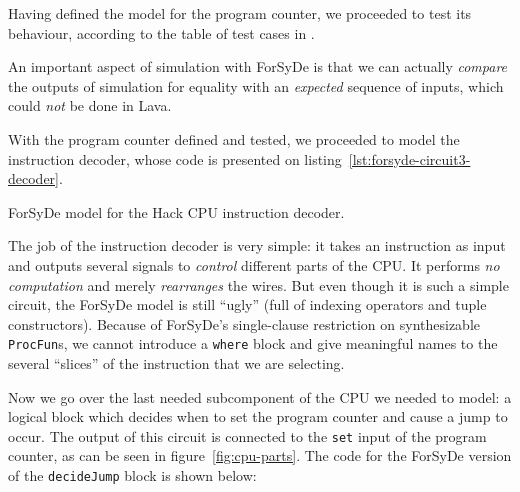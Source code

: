             Having defined the model for the program counter, we proceeded to test its behaviour,
            according to the table of test cases in \cite{nand2tetris-chapter-cpu}.


            An important aspect of simulation with ForSyDe is that we can actually \emph{compare}
            the outputs of simulation for equality with an \emph{expected} sequence of inputs, which
            could \emph{not} be done in Lava.

            With the program counter defined and tested, we proceeded to model the instruction
            decoder, whose code is presented on listing~\ref{lst:forsyde-circuit3-decoder}.

            \begin{listing}[h!]
                \caption{ForSyDe model for the Hack CPU instruction decoder.
                    \label{lst:forsyde-circuit3-decoder}}
            \end{listing}

            The job of the instruction decoder is very simple: it takes an instruction as input and
            outputs several signals to \emph{control} different parts of the CPU. It performs
            \emph{no computation} and merely \emph{rearranges} the wires. But even though it is such
            a simple circuit, the ForSyDe model is still ``ugly'' (full of indexing operators and
            tuple constructors). Because of ForSyDe's single-clause restriction on synthesizable
            \texttt{ProcFun}s, we cannot introduce a \texttt{where} block and give meaningful names
            to the several ``slices'' of the instruction that we are selecting.

            Now we go over the last needed subcomponent of the CPU we needed to model: a logical
            block which decides when to set the program counter and cause a jump to occur. The
            output of this circuit is connected to the \texttt{set} input of the program counter, as
            can be seen in figure~\ref{fig:cpu-parts}. The code for the ForSyDe version of the
            \texttt{decideJump} block is shown below:


